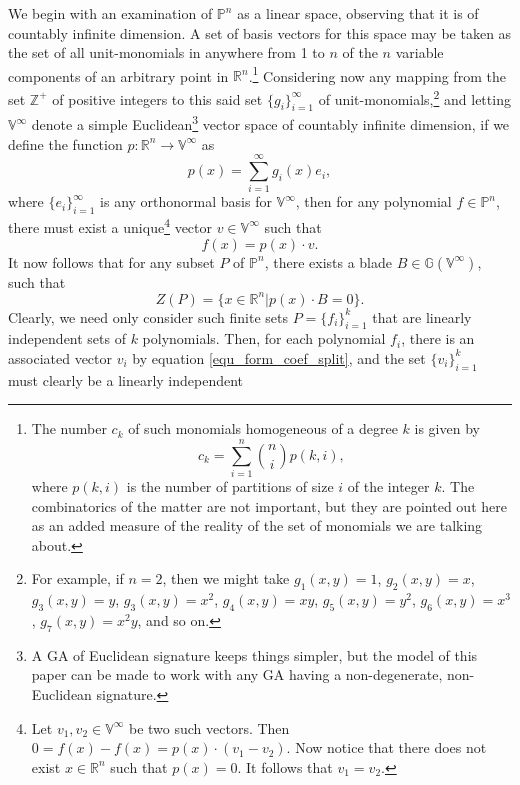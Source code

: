 \documentclass{birkjour}
\theoremstyle{definition}
\theoremstyle{remark}
\numberwithin{equation}{section}
\newcommand{\G}{\mathbb{G}}
\newcommand{\V}{\mathbb{V}}
\newcommand{\R}{\mathbb{R}}
\newcommand{\Z}{\mathbb{Z}}
\newcommand{\Poly}{\mathbb{P}}
\begin{document}
We begin with an examination of $\Poly^n$ as a linear space, observing that
it is of countably infinite dimension.  A set of basis vectors for this space may be taken
as the set of all unit-monomials in anywhere from 1 to $n$ of the $n$ variable components
of an arbitrary point in $\R^n$.\footnote{The
number $c_k$ of such monomials homogeneous of a degree $k$ is given by
\begin{equation*}
c_k=\sum_{i=1}^n\binom{n}{i}p(k,i),
\end{equation*}
where $p(k,i)$ is the number of partitions of size $i$ of the integer $k$.  The
combinatorics of the matter are not important, but they are pointed out here as an added
measure of the reality of the set of monomials we are talking about.}
Considering now any mapping from the set $\Z^+$ of
positive integers to this said set $\{g_i\}_{i=1}^\infty$ of unit-monomials,\footnote{For example,
if $n=2$, then we might take $g_1(x,y)=1$, $g_2(x,y)=x$, $g_3(x,y)=y$, $g_3(x,y)=x^2$,
$g_4(x,y)=xy$, $g_5(x,y)=y^2$, $g_6(x,y)=x^3$, $g_7(x,y)=x^2y$, and so on.}
and letting $\V^\infty$ denote a simple Euclidean\footnote{A GA of Euclidean signature
keeps things simpler, but the model of this paper can be made to work with any GA having
a non-degenerate, non-Euclidean signature.}
vector space of countably infinite
dimension, if we define the function $p:\R^n\to\V^\infty$ as
\begin{equation}\label{equ_form_vector}
p(x) = \sum_{i=1}^\infty g_i(x)e_i,
\end{equation}
where $\{e_i\}_{i=1}^\infty$ is any orthonormal basis for $\V^\infty$, then for
any polynomial $f\in\Poly^n$, there must exist a unique\footnote{Let $v_1,v_2\in\V^\infty$
be two such vectors.  Then $0=f(x)-f(x)=p(x)\cdot (v_1-v_2)$.  Now notice that there
does not exist $x\in\R^n$ such that $p(x)=0$.  It follows that $v_1=v_2$.}
vector $v\in\V^\infty$ such that
\begin{equation}\label{equ_form_coef_split}
f(x) = p(x)\cdot v.
\end{equation}
It now follows that for any subset $P$ of $\Poly^n$, there exists a blade $B\in\G(\V^\infty)$,
such that
\begin{equation}
Z(P) = \{x\in\R^n|p(x)\cdot B=0\}.
\end{equation}
Clearly, we need only consider such finite sets $P=\{f_i\}_{i=1}^k$ that are linearly independent
sets of $k$ polynomials.  Then, for each polynomial $f_i$, there is an associated vector $v_i$ by
equation \eqref{equ_form_coef_split}, and the set $\{v_i\}_{i=1}^k$ must clearly be a linearly independent
\end{document}
